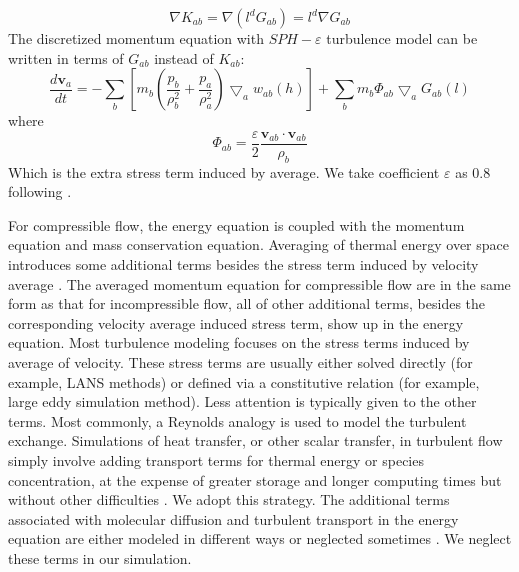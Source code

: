 %
%
\begin{equation}
\nabla K_{ab} = \nabla \left(l^d G_{ab}\right) = l^d \nabla G_{ab}
\end{equation}
The discretized momentum equation with $SPH-\varepsilon$ turbulence model can be written in terms of $G_{ab}$ instead of $K_{ab}$:
\begin{equation}
\label{eq:SPH-mom-epsilon-turb}
\dfrac{d \textbf{v}_a}{dt} = -\sum_b \left[m_b \left(\dfrac{p_b}{\rho_b^2} + \dfrac{p_a}{\rho_a^2}\right) \bigtriangledown_aw_{a b}\left(h\right)\right] + \sum_b m_b \Phi_{ab}\bigtriangledown_aG_{ab}\left(l\right)
\end{equation}
where 
\begin{equation}
\Phi_{ab}=\dfrac{\varepsilon}{2} \dfrac{\textbf{v}_{ab} \cdot \textbf{v}_{ab}}{\rho_b} 
\end{equation}
Which is the extra stress term induced by average. We take coefficient $\varepsilon$ as 0.8 following \citet{monaghan2011turbulence}.

For compressible flow, the energy equation is coupled with the momentum equation and mass conservation equation. Averaging of thermal energy over space introduces some additional terms besides the stress term induced by velocity average \citep{NASACompressibleTurbulence}. The averaged momentum equation for compressible flow are in the same form as that for incompressible flow, all of other additional terms, besides the corresponding velocity average induced stress term, show up in the energy equation. Most turbulence modeling focuses on the stress terms induced by average of velocity. These stress terms are usually either solved directly (for example, LANS methods) or defined via a constitutive relation (for example, large eddy simulation method). Less attention is typically given to the other terms. Most commonly, a Reynolds analogy is used to model the turbulent exchange. Simulations of heat transfer, or other scalar transfer, in turbulent flow simply involve adding transport terms for thermal energy or species concentration, at the expense of greater storage and longer computing times but without other difficulties \citep{cebeci2013analysis}. We adopt this strategy. %
The additional terms associated with molecular diffusion and turbulent transport in the energy equation are either modeled in different ways or neglected sometimes \citep{NASACompressibleTurbulence}. We neglect these terms in our simulation.

